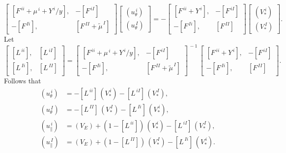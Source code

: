 \documentclass[12pt]{article}
\begin{document}
\begin{equation}
\left[\begin{array}{rr} [F^{\,ii}+\mu^{\,i}+Y^{\,i}/y], & -[F^{\,iI}]\\[0.5ex] -[F^{\,Ii}], & [F^{\,II}+\tilde{\mu}^{\,I}]\end{array}\right]
\left[\begin{array}{c}(u_\theta^{\,i}) \\[0.5ex] (u_\theta^{\,I})\end{array}\right]
= -\left[\begin{array}{rr} [F^{\,ii}+Y^{\,i}], & -[F^{\,iI}]\\[0.5ex] -[F^{\,Ii}], & [F^{\,II}]\end{array}\right]
\left[\begin{array}{c} (V_\ast^{\,i})\\[0.5ex]
(V_\ast^{\,I})\end{array}\right].
\end{equation}
Let
\begin{equation}
\left[\begin{array}{rr} [L^{\,ii}], & [L^{\,iI}]\\[0.5ex] [L^{\,Ii}],& [L^{\,II}]\end{array}\right]=\left[\begin{array}{rr} [F^{\,ii}+\mu^{\,i}+Y^{\,i}/y], & -[F^{\,iI}]\\[0.5ex] -[F^{\,Ii}], & [F^{\,II}+\tilde{\mu}^{\,I}]\end{array}\right]^{\,-1}
\,
\left[\begin{array}{rr} [F^{\,ii}+Y^{\,i}], & -[F^{\,iI}]\\[0.5ex] -[F^{\,Ii}], & [F^{\,II}]\end{array}\right].
\end{equation}
Follows that
\begin{align}
(u_\theta^{\,i}) &= -[L^{\,ii}]\,(V_\ast^{\,i})-[L^{\,iI}]\,(V_\ast^{\,I}),\\[0.5ex]
(u_\theta^{\,I}) &= - [L^{\,II}]\,(V_\ast^{\,I}) - [L^{\,Ii}]\,(V_\ast^{\,i}),\\[0.5ex]
(u_\parallel^{\,i}) &= (V_E) + (1-[L^{\,ii}])\,(V_\ast^{\,i}) -[L^{\,iI}]\,(V_\ast^{\,I}),\\[0.5ex]
(u_\parallel^{\,I}) &= (V_E) + (1-[L^{\,II}])\,(V_\ast^{\,I}) -[L^{\,Ii}]\,(V_\ast^{\,i}).
\end{align}
\end{document}
